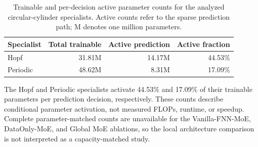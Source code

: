 \documentclass{article}
\begin{document}
\par
\begin{table}[H]
\centering
\caption{Trainable and per-decision active parameter counts for the analyzed
circular-cylinder specialists. Active counts refer to the sparse prediction
path; M denotes one million parameters.}
\label{tab:parameter_counts}
\begin{tabular}{lrrr}
\toprule
Specialist & Total trainable & Active prediction & Active fraction \\
\midrule
Hopf & 31.81M & 14.17M & 44.53\% \\
Periodic & 48.62M & 8.31M & 17.09\% \\
\bottomrule
\end{tabular}
\end{table}
\par

The Hopf and Periodic specialists activate 44.53\% and 17.09\% of their
trainable parameters per prediction decision, respectively. These counts
describe conditional parameter activation, not measured FLOPs, runtime,
or speedup. Complete parameter-matched counts are unavailable for the
Vanilla-FNN-MoE, DataOnly-MoE, and Global MoE ablations, so the local
architecture comparison is not interpreted as a capacity-matched study.
\end{document}
